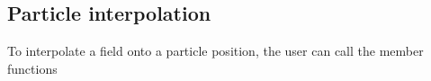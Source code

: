 \documentclass[letterpaper,10pt,english]{sphinxmanual}
\begin{document}
\begin{sphinxVerbatim}[commandchars=\\\{\},formatcom=\scriptsize]
  
\end{sphinxVerbatim}


\subsection{Particle interpolation}
\label{\detokenize{Source/Particles:particle-interpolation}}
To interpolate a field onto a particle position, the user can call the  member functions
\end{document}
